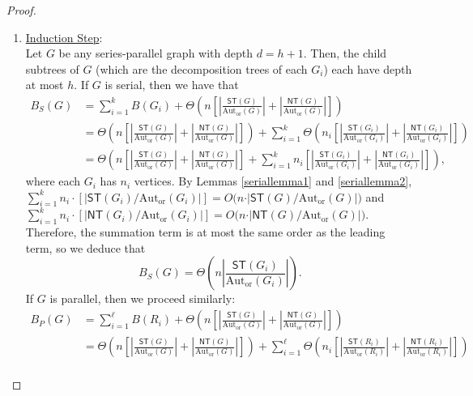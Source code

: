 \documentclass[10pt,a4paper]{amsart}
\begin{document}
\begin{proof}
\begin{enumerate}
        \item \underline{Induction Step}:\\[6pt]
        Let $G$ be any series-parallel graph with depth $d = h + 1$. Then, the child subtrees of $G$ (which are the decomposition trees of each $G_i$) each have depth at most $h$. If $G$ is serial, then we have that
        \begin{align*}
            B_S(G) &= \sum_{i = 1}^k B(G_i) + \Theta\left(n\left[\left\vert \frac{\textsf{ST}(G)}{\text{Aut}_\text{or}(G)}\right\vert + \left\vert \frac{\textsf{NT}(G)}{\text{Aut}_\text{or}(G)}\right\vert\right]\right)\\[6pt]
            &= \Theta\left(n\left[\left\vert \frac{\textsf{ST}(G)}{\text{Aut}_\text{or}(G)}\right\vert + \left\vert \frac{\textsf{NT}(G)}{\text{Aut}_\text{or}(G)}\right\vert\right]\right) + \sum_{i = 1}^k \Theta\left(n_i\left[\left\vert \frac{\textsf{ST}(G_i)}{\text{Aut}_\text{or}(G_i)}\right\vert + \left\vert \frac{\textsf{NT}(G_i)}{\text{Aut}_\text{or}(G_i)}\right\vert\right]\right)\\[6pt]
            &= \Theta\left(n\left[\left\vert \frac{\textsf{ST}(G)}{\text{Aut}_\text{or}(G)}\right\vert + \left\vert \frac{\textsf{NT}(G)}{\text{Aut}_\text{or}(G)}\right\vert\right] + \sum_{i = 1}^k n_i\left[\left\vert \frac{\textsf{ST}(G_i)}{\text{Aut}_\text{or}(G_i)}\right\vert + \left\vert \frac{\textsf{NT}(G_i)}{\text{Aut}_\text{or}(G_i)}\right\vert\right]\right),
        \end{align*}
        where each $G_i$ has $n_i$ vertices. By Lemmas \ref{seriallemma1} and \ref{seriallemma2}, $\sum_{i = 1}^k n_i\cdot [\vert \textsf{ST}(G_i)/\text{Aut}_\text{or}(G_i)\vert] = O\big(n\cdot\vert \textsf{ST}(G)/\text{Aut}_\text{or}(G)\vert\big)$ and $\sum_{i = 1}^k n_i\cdot [\vert \textsf{NT}(G_i)/\text{Aut}_\text{or}(G_i)\vert] = O\big(n\cdot\vert \textsf{NT}(G)/\text{Aut}_\text{or}(G)\vert\big)$. Therefore, the summation term is at most the same order as the leading term, so we deduce that
        \[B_S(G) = \Theta\left(n\left\vert \frac{\textsf{ST}(G_i)}{\text{Aut}_\text{or}(G_i)}\right\vert\right).\]
        If $G$ is parallel, then we proceed similarly:
        \begin{align*}
            B_P(G) &= \sum_{i = 1}^\ell B(R_i) + \Theta\left(n\left[\left\vert \frac{\textsf{ST}(G)}{\text{Aut}_\text{or}(G)}\right\vert + \left\vert \frac{\textsf{NT}(G)}{\text{Aut}_\text{or}(G)}\right\vert\right]\right)\\[6pt]
            &= \Theta\left(n\left[\left\vert \frac{\textsf{ST}(G)}{\text{Aut}_\text{or}(G)}\right\vert + \left\vert \frac{\textsf{NT}(G)}{\text{Aut}_\text{or}(G)}\right\vert\right]\right) + \sum_{i = 1}^\ell \Theta\left(n_i\left[\left\vert \frac{\textsf{ST}(R_i)}{\text{Aut}_\text{or}(R_i)}\right\vert + \left\vert \frac{\textsf{NT}(R_i)}{\text{Aut}_\text{or}(R_i)}\right\vert\right]\right)\\[6pt]

\end{align*}
\end{enumerate}
\end{proof}
\end{document}
